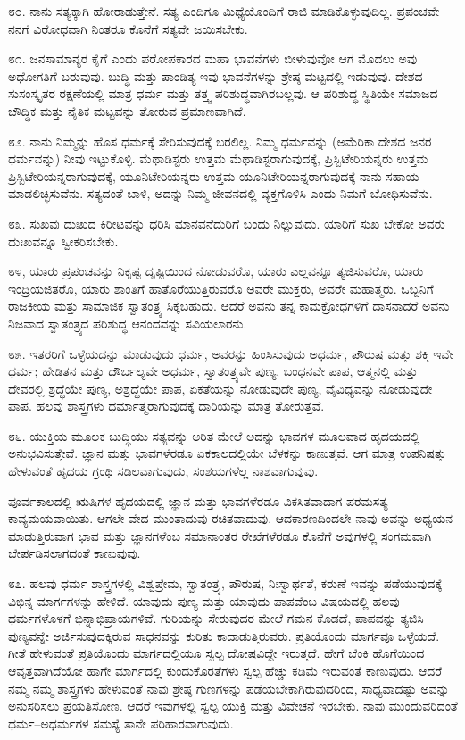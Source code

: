 ೮೦. ನಾನು ಸತ್ಯಕ್ಕಾಗಿ ಹೋರಾಡುತ್ತೇನೆ. ಸತ್ಯ ಎಂದಿಗೂ ಮಿಥ್ಯೆಯೊಂದಿಗೆ ರಾಜಿ ಮಾಡಿಕೊಳ್ಳುವುದಿಲ್ಲ. ಪ್ರಪಂಚವೇ ನನಗೆ ವಿರೋಧವಾಗಿ ನಿಂತರೂ ಕೊನೆಗೆ ಸತ್ಯವೇ ಜಯಿಸಬೇಕು.

೮೧. ಜನಸಾಮಾನ್ಯರ ಕೈಗೆ ಎಂದು ಪರೋಪಕಾರದ ಮಹಾ ಭಾವನೆಗಳು ಬೀಳುವುವೋ ಆಗ ಮೊದಲು ಅವು ಅಧೋಗತಿಗೆ ಬರುವುವು. ಬುದ್ಧಿ ಮತ್ತು ಪಾಂಡಿತ್ಯ ಇವು ಭಾವನೆಗಳನ್ನು ಶ್ರೇಷ್ಠ ಮಟ್ಟದಲ್ಲಿ ಇಡುವುವು. ದೇಶದ ಸುಸಂಸ್ಕೃತರ ರಕ್ಷಣೆಯಲ್ಲಿ ಮಾತ್ರ ಧರ್ಮ ಮತ್ತು ತತ್ತ್ವ ಪರಿಶುದ್ಧವಾಗಿರಬಲ್ಲವು. ಆ ಪರಿಶುದ್ಧ ಸ್ಥಿತಿಯೇ ಸಮಾಜದ ಬೌದ್ಧಿಕ ಮತ್ತು ನೈತಿಕ ಮಟ್ಟವನ್ನು ತೋರುವ ಪ್ರಮಾಣವಾಗಿದೆ.

೮೨. ನಾನು ನಿಮ್ಮನ್ನು ಹೊಸ ಧರ್ಮಕ್ಕೆ ಸೇರಿಸುವುದಕ್ಕೆ ಬರಲಿಲ್ಲ. ನಿಮ್ಮ ಧರ್ಮವನ್ನು (ಅಮೆರಿಕಾ ದೇಶದ ಜನರ ಧರ್ಮವನ್ನು) ನೀವು ಇಟ್ಟುಕೊಳ್ಳಿ. ಮೆಥಾಡಿಸ್ಟರು ಉತ್ತಮ ಮೆಥಾಡಿಸ್ಟರಾಗುವುದಕ್ಕೆ, ಪ್ರಿಸ್ಬಿಟೇರಿಯನ್ನರು ಉತ್ತಮ ಪ್ರಿಸ್ಬಿಟೇರಿಯನ್ನರಾಗುವುದಕ್ಕೆ, ಯೂನಿಟೇರಿಯನ್ನರು ಉತ್ತಮ ಯೂನಿಟೇರಿಯನ್ನರಾಗುವುದಕ್ಕೆ ನಾನು ಸಹಾಯ ಮಾಡಲಿಚ್ಛಿಸುವೆನು. ಸತ್ಯದಂತೆ ಬಾಳಿ, ಅದನ್ನು ನಿಮ್ಮ ಜೀವನದಲ್ಲಿ ವ್ಯಕ್ತಗೊಳಿಸಿ ಎಂದು ನಿಮಗೆ ಬೋಧಿಸುವೆನು.

೮೩. ಸುಖವು ದುಃಖದ ಕಿರೀಟವನ್ನು ಧರಿಸಿ ಮಾನವನೆದುರಿಗೆ ಬಂದು ನಿಲ್ಲುವುದು. ಯಾರಿಗೆ ಸುಖ ಬೇಕೋ ಅವರು ದುಃಖವನ್ನೂ ಸ್ವೀಕರಿಸಬೇಕು.

೮೪, ಯಾರು ಪ್ರಪಂಚವನ್ನು ನಿಕೃಷ್ಟ ದೃಷ್ಟಿಯಿಂದ ನೋಡುವರೊ, ಯಾರು ಎಲ್ಲವನ್ನೂ ತ್ಯಜಿಸುವರೊ, ಯಾರು ಇಂದ್ರಿಯಜಿತರೊ, ಯಾರು ಶಾಂತಿಗೆ ಹಾತೊರೆಯುತ್ತಿರುವರೊ ಅವರೇ ಮುಕ್ತರು, ಅವರೇ ಮಹಾತ್ಮರು. ಒಬ್ಬನಿಗೆ ರಾಜಕೀಯ ಮತ್ತು ಸಾಮಾಜಿಕ ಸ್ವಾತಂತ್ರ್ಯ ಸಿಕ್ಕಬಹುದು. ಆದರೆ ಅವನು ತನ್ನ ಕಾಮಕ್ರೋಧಗಳಿಗೆ ದಾಸನಾದರೆ ಅವನು ನಿಜವಾದ ಸ್ವಾತಂತ್ರ್ಯದ ಪರಿಶುದ್ಧ ಆನಂದವನ್ನು ಸವಿಯಲಾರನು.

೮೫. ಇತರರಿಗೆ ಒಳ್ಳೆಯದನ್ನು ಮಾಡುವುದು ಧರ್ಮ, ಅವರನ್ನು ಹಿಂಸಿಸುವುದು ಅಧರ್ಮ, ಪೌರುಷ ಮತ್ತು ಶಕ್ತಿ ಇವೇ ಧರ್ಮ; ಹೇಡಿತನ ಮತ್ತು ದೌರ್ಬಲ್ಯವೇ ಅಧರ್ಮ, ಸ್ವಾತಂತ್ರ್ಯವೇ ಪುಣ್ಯ, ಬಂಧನವೇ ಪಾಪ, ಆತ್ಮನಲ್ಲಿ ಮತ್ತು ದೇವರಲ್ಲಿ ಶ್ರದ್ಧೆಯೇ ಪುಣ್ಯ, ಅಶ್ರದ್ಧೆಯೇ ಪಾಪ, ಏಕತೆಯನ್ನು ನೋಡುವುದೇ ಪುಣ್ಯ, ವೈವಿಧ್ಯವನ್ನು ನೋಡುವುದೇ ಪಾಪ. ಹಲವು ಶಾಸ್ತ್ರಗಳು ಧರ್ಮಾತ್ಮರಾಗುವುದಕ್ಕೆ ದಾರಿಯನ್ನು ಮಾತ್ರ ತೋರುತ್ತವೆ.

೮೬. ಯುಕ್ತಿಯ ಮೂಲಕ ಬುದ್ಧಿಯು ಸತ್ಯವನ್ನು ಅರಿತ ಮೇಲೆ ಅದನ್ನು ಭಾವಗಳ  ಮೂಲವಾದ ಹೃದಯದಲ್ಲಿ ಅನುಭವಿಸುತ್ತೇವೆ. ಜ್ಞಾನ ಮತ್ತು ಭಾವಗಳೆರಡೂ ಏಕಕಾಲದಲ್ಲಿಯೇ ಬೆಳಕನ್ನು ಕಾಣುತ್ತವೆ. ಆಗ ಮಾತ್ರ ಉಪನಿಷತ್ತು ಹೇಳುವಂತೆ ಹೃದಯ ಗ್ರಂಥಿ ಸಡಿಲವಾಗುವುದು, ಸಂಶಯಗಳೆಲ್ಲ ನಾಶವಾಗುವುವು.

ಪೂರ್ವಕಾಲದಲ್ಲಿ ಋಷಿಗಳ ಹೃದಯದಲ್ಲಿ ಜ್ಞಾನ ಮತ್ತು ಭಾವಗಳೆರಡೂ ವಿಕಸಿತವಾದಾಗ ಪರಮಸತ್ಯ ಕಾವ್ಯಮಯವಾಯಿತು. ಆಗಲೇ ವೇದ ಮುಂತಾದುವು ರಚಿತವಾದುವು. ಆದಕಾರಣದಿಂದಲೇ ನಾವು ಅವನ್ನು ಅಧ್ಯಯನ ಮಾಡುತ್ತಿರುವಾಗ ಭಾವ ಮತ್ತು ಜ್ಞಾನಗಳೆಂಬ ಸಮಾನಾಂತರ ರೇಖೆಗಳೆರಡೂ ಕೊನೆಗೆ ಅವುಗಳಲ್ಲಿ ಸಂಗಮವಾಗಿ ಬೇರ್ಪಡಿಸಲಾಗದಂತೆ ಕಾಣುವುವು.

೮೭. ಹಲವು ಧರ್ಮ ಶಾಸ್ತ್ರಗಳಲ್ಲಿ ವಿಶ್ವಪ್ರೇಮ, ಸ್ವಾತಂತ್ರ್ಯ, ಪೌರುಷ, ನಿಃಸ್ವಾರ್ಥತೆ, ಕರುಣೆ ಇವನ್ನು ಪಡೆಯುವುದಕ್ಕೆ ವಿಭಿನ್ನ ಮಾರ್ಗಗಳನ್ನು ಹೇಳಿದೆ. ಯಾವುದು ಪುಣ್ಯ ಮತ್ತು ಯಾವುದು ಪಾಪವೆಂಬ ವಿಷಯದಲ್ಲಿ ಹಲವು ಧರ್ಮಗಳೊಳಗೆ ಭಿನ್ನಾಭಿಪ್ರಾಯಗಳಿವೆ. ಗುರಿಯನ್ನು ಸೇರುವುದರ ಮೇಲೆ ಗಮನ ಕೊಡದೆ, ಪಾಪವನ್ನು ತ್ಯಜಿಸಿ ಪುಣ್ಯವನ್ನೇ ಅರ್ಜಿಸುವುದಕ್ಕಿರುವ ಸಾಧನವನ್ನು ಕುರಿತು ಕಾದಾಡುತ್ತಿರುವರು. ಪ್ರತಿಯೊಂದು ಮಾರ್ಗವೂ ಒಳ್ಳೆಯದೆ. ಗೀತೆ ಹೇಳುವಂತೆ ಪ್ರತಿಯೊಂದು ಮಾರ್ಗದಲ್ಲಿಯೂ ಸ್ವಲ್ಪ ದೋಷವಿದ್ದೇ ಇರುತ್ತದೆ. ಹೇಗೆ ಬೆಂಕಿ ಹೊಗೆಯಿಂದ ಆವೃತ್ತವಾಗಿದೆಯೋ ಹಾಗೇ ಮಾರ್ಗದಲ್ಲಿ ಕುಂದುಕೊರತೆಗಳು ಸ್ವಲ್ಪ ಹೆಚ್ಚು ಕಡಿಮೆ ಇರುವಂತೆ ಕಾಣುವುದು. ಆದರೆ ನಮ್ಮ ನಮ್ಮ ಶಾಸ್ತ್ರಗಳು ಹೇಳುವಂತೆ ನಾವು ಶ್ರೇಷ್ಠ ಗುಣಗಳನ್ನು ಪಡೆಯಬೇಕಾಗಿರುವುದರಿಂದ, ಸಾಧ್ಯವಾದಷ್ಟು ಅವನ್ನು ಅನುಸರಿಸಲು ಪ್ರಯತಿಸೋಣ. ಆದರೆ ಇವುಗಳಲ್ಲಿ ಸ್ವಲ್ಪ ಯುಕ್ತಿ ಮತ್ತು ವಿವೇಚನೆ ಇರಬೇಕು. ನಾವು ಮುಂದುವರಿದಂತೆ ಧರ್ಮ–ಅಧರ್ಮಗಳ ಸಮಸ್ಯೆ ತಾನೇ ಪರಿಹಾರವಾಗುವುದು.

